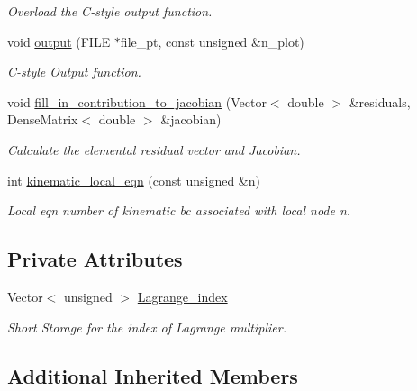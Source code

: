 \begin{DoxyCompactItemize}
\begin{DoxyCompactList}\small\item\em Overload the C-\/style output function. \end{DoxyCompactList}\item 
void \hyperlink{classoomph_1_1ElasticLineFluidInterfaceBoundingElement_a6e4c4d356c7d66f6b5ec4c7a375ecc91}{output} (F\+I\+LE $\ast$file\+\_\+pt, const unsigned \&n\+\_\+plot)
\begin{DoxyCompactList}\small\item\em C-\/style Output function. \end{DoxyCompactList}\item 
void \hyperlink{classoomph_1_1ElasticLineFluidInterfaceBoundingElement_a71b23e3ad49d5137ca4a7f654f828077}{fill\+\_\+in\+\_\+contribution\+\_\+to\+\_\+jacobian} (Vector$<$ double $>$ \&residuals, Dense\+Matrix$<$ double $>$ \&jacobian)
\begin{DoxyCompactList}\small\item\em Calculate the elemental residual vector and Jacobian. \end{DoxyCompactList}\item 
int \hyperlink{classoomph_1_1ElasticLineFluidInterfaceBoundingElement_a0f3d4bdd756165d6a2225f5b13eac005}{kinematic\+\_\+local\+\_\+eqn} (const unsigned \&n)
\begin{DoxyCompactList}\small\item\em Local eqn number of kinematic bc associated with local node n. \end{DoxyCompactList}\end{DoxyCompactItemize}
\subsection*{Private Attributes}
\begin{DoxyCompactItemize}
\item 
Vector$<$ unsigned $>$ \hyperlink{classoomph_1_1ElasticLineFluidInterfaceBoundingElement_ab60624e63f1ef1b59d191a83b16eb1de}{Lagrange\+\_\+index}
\begin{DoxyCompactList}\small\item\em Short Storage for the index of Lagrange multiplier. \end{DoxyCompactList}\end{DoxyCompactItemize}
\subsection*{Additional Inherited Members}


